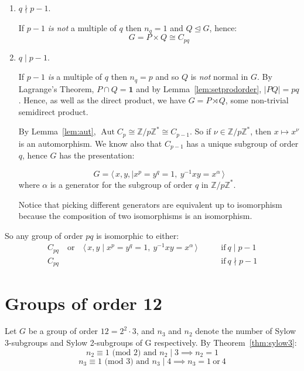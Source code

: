 \documentclass[a4paper, oneside, 12pt, final]{article}
\theoremstyle{definition}
\DeclareMathOperator{\Aut}{Aut}
\newcommand{\Z}{\mathbb{Z}}
\newcommand{\Zn}[1]{\Z/#1\Z}
\begin{document}
\begin{enumerate}
    \item \(q \nmid p - 1\).

        If \(p-1\) \emph{is not} a multiple of \(q\) then \(n_q = 1\) and \(Q \unlhd G\), hence:
        \[G = P \times Q \cong C_{pq}\]

    \item \( q \mid p - 1\).

        If \(p-1\) \emph{is} a multiple of \(q\) then \(n_q = p\) and so \(Q\) is \emph{not} normal in \(G\).
        By Lagrange's Theorem, \(P \cap Q = \bm{1}\) and by Lemma~\ref{lem:setprodorder}, \(|PQ| = pq\).
        Hence, as well as the direct product, we have \(G = P \rtimes Q\), some non-trivial semidirect product.

        By Lemma~\ref{lem:aut}, \(\Aut{C_p} \cong \Zn{p}^* \cong C_{p-1}\).
        So if \(\nu \in \Zn{p}^*\), then \(x \mapsto x^\nu\) is an automorphism.
        We know also that \(C_{p-1}\) has a unique subgroup of order \(q\),
        hence \(G\) has the presentation:

        \[G = \langle \, x, y, \mid x^p = y^q = 1,\ y^{-1}xy = x^\alpha \, \rangle\]
        where \(\alpha\) is a generator for the subgroup of order \(q\) in
        \(\Zn{p}^*\).

        Notice that picking different generators are equivalent up to isomorphism because the composition of two
        isomorphisms is an isomorphism.
\end{enumerate}

So any group of order \(pq\) is isomorphic to either:
\begin{equation*}
\begin{aligned}
    C_{pq} \quad \text{or} \quad \langle \, x, y \mid x^p = y^q = 1,\ y^{-1}xy
    = x^\alpha \, \rangle \qquad &\text{if} \ q \mid p-1 \\
    C_{pq} \qquad &\text{if} \ q \nmid p-1
\end{aligned}
\end{equation*}


\section{Groups of order 12}
Let \(G\) be a group of order \(12 = 2^2 \cdot 3\), and \(n_3\) and \(n_2\) denote the number of Sylow 3-subgroups and
Sylow 2-subgroups of G respectively.
By Theorem~\ref{thm:sylow3}:
\[n_2 \equiv 1 \text{ (mod 2) and } n_2 \mid 3 \implies n_2 = 1\]
\[n_3 \equiv 1 \text{ (mod 3) and } n_3 \mid 4 \implies n_3 = 1 \ \text{or} \ 4\]
\end{document}
